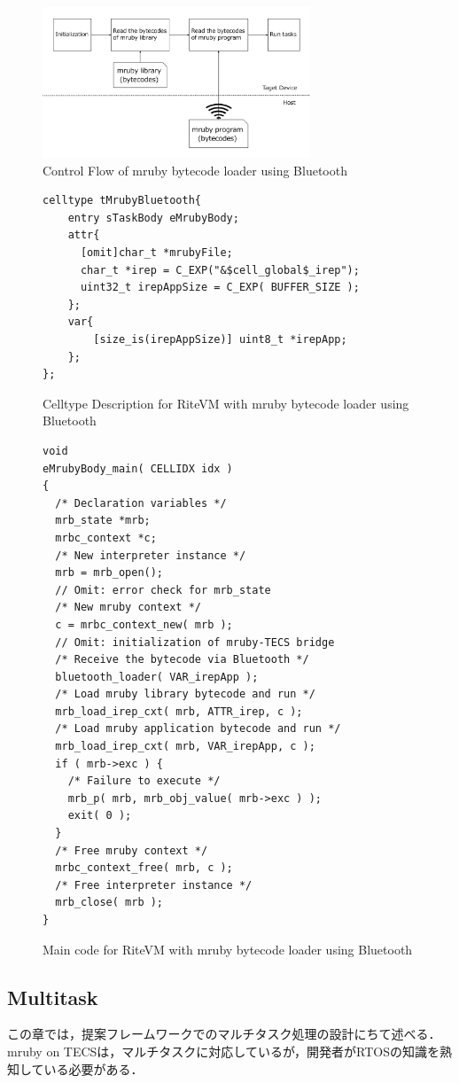 \documentclass[submit]{ipsj_v2/UTF8/ipsj}
\begin{document}
\begin{figure}[t]
    \centering
    \includegraphics[width=8cm,clip]{../EMSOFT2016/figure/control_flow.pdf}
    \caption{Control Flow of mruby bytecode loader using Bluetooth}
    \label{fig:control_flow}
\end{figure}
\begin{figure}[t]
\centering
\begin{lstlisting}
celltype tMrubyBluetooth{
    entry sTaskBody eMrubyBody;
    attr{
      [omit]char_t *mrubyFile;
      char_t *irep = C_EXP("&$cell_global$_irep");
      uint32_t irepAppSize = C_EXP( BUFFER_SIZE );
    };
    var{
        [size_is(irepAppSize)] uint8_t *irepApp;
    };
};
\end{lstlisting}
\caption{Celltype Description for RiteVM with mruby bytecode loader using Bluetooth}
\label{celltype_mrubybluetooth}
\end{figure}
\begin{figure}[t]
\centering
\begin{lstlisting}
void
eMrubyBody_main( CELLIDX idx )
{
  /* Declaration variables */
  mrb_state *mrb;
  mrbc_context *c;
  /* New interpreter instance */
  mrb = mrb_open();
  // Omit: error check for mrb_state
  /* New mruby context */
  c = mrbc_context_new( mrb );
  // Omit: initialization of mruby-TECS bridge
  /* Receive the bytecode via Bluetooth */
  bluetooth_loader( VAR_irepApp );
  /* Load mruby library bytecode and run */
  mrb_load_irep_cxt( mrb, ATTR_irep, c );
  /* Load mruby application bytecode and run */
  mrb_load_irep_cxt( mrb, VAR_irepApp, c );
  if ( mrb->exc ) {
    /* Failure to execute */
    mrb_p( mrb, mrb_obj_value( mrb->exc ) );
    exit( 0 );
  }
  /* Free mruby context */
  mrbc_context_free( mrb, c );
  /* Free interpreter instance */
  mrb_close( mrb );
}

\end{lstlisting}
\caption{Main code for RiteVM with mruby bytecode loader using Bluetooth}
\label{maincode_mrubybluetooth}
\end{figure}
\subsection{Multitask}
\label{sec:Multitask}
この章では，提案フレームワークでのマルチタスク処理の設計にちて述べる．
mruby on TECSは，マルチタスクに対応しているが，開発者がRTOSの知識を熟知している必要がある．
\end{document}

